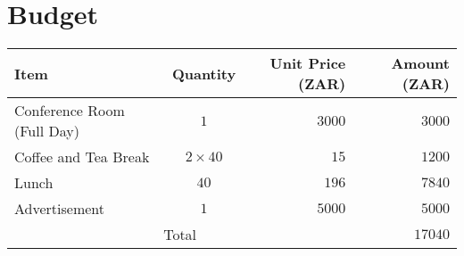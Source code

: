 \documentclass[10pt]{article}
\newcommand{\otoprule}{\midrule[\heavyrulewidth]}
\begin{document}
\section{Budget}
\label{sec:budget}

\begin{center}
    \begin{tabular}{lcrr}
        \toprule
        {\bfseries{Item}} & {\bfseries{Quantity}} & {\bfseries{Unit Price}} (ZAR) & {\bfseries{Amount}} (ZAR)\\
        \otoprule
        Conference Room (Full Day) & $1$ & $3000$ & $3000$\\
        \midrule
        Coffee and Tea Break & $2\times 40$ & $15$ & $1200$\\
        \midrule
        Lunch & $40$ & $196$ & $7840$\\
        \midrule
        Advertisement & $1$ & $5000$ & $5000$\\
	\midrule\midrule
        \multicolumn{3}{c}{Total} & $17040$\\
        \bottomrule
    \end{tabular}
\end{center}
\end{document}

